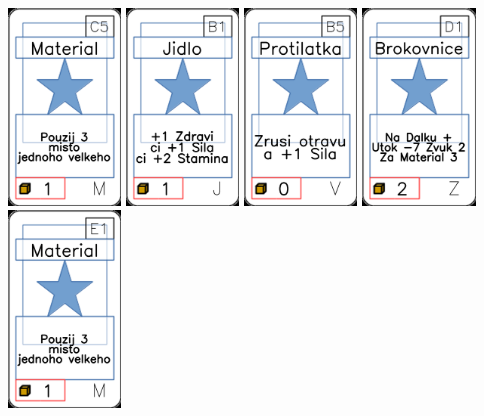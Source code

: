 \documentclass[a4paper]{article}
\begin{document}
	\includegraphics[width=3.0cm]{img-1_44}
	\includegraphics[width=3.0cm]{img-1_5}
	\includegraphics[width=3.0cm]{img-1_69}
	\includegraphics[width=3.0cm]{img-1_105}
	\includegraphics[width=3.0cm]{img-1_50}
\end{document}
